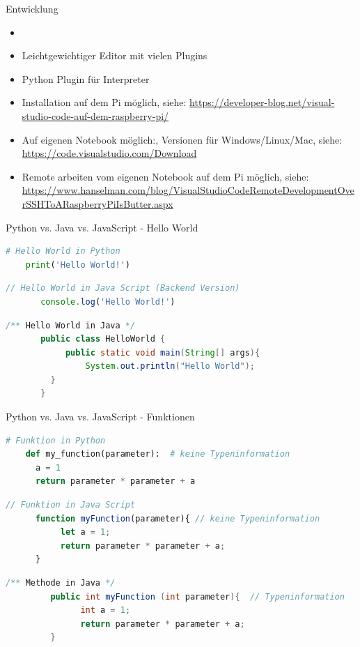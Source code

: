 \begin{frame}{Entwicklung}

    \begin{itemize}
    \setlength{\itemindent}{2.1in}
     \item [\textbf{ Entwicklung mit Visual Studio Code }]
    \end{itemize}
    \begin{itemize}
        \item Leichtgewichtiger Editor mit vielen Plugins
        \item Python Plugin für Interpreter
        \item Installation auf dem Pi möglich,  siehe: \url{https://developer-blog.net/visual-studio-code-auf-dem-raspberry-pi/}
        \item Auf eigenen Notebook möglich:, Versionen für Windows/Linux/Mac, siehe: \url{https://code.visualstudio.com/Download}
        \item Remote arbeiten vom eigenen Notebook auf dem Pi möglich, siehe: \url{https://www.hanselman.com/blog/VisualStudioCodeRemoteDevelopmentOverSSHToARaspberryPiIsButter.aspx}

     \end{itemize}
\end{frame}




\begin{frame}[fragile]{Python vs. Java vs. JavaScript - Hello World}
\begin{lstlisting}[language=Python]
	# Hello World in Python
 	print('Hello World!')
\end{lstlisting}
\begin{lstlisting}[language=JavaScript]
       // Hello World in Java Script (Backend Version)
       console.log('Hello World!')
\end{lstlisting}
\begin{lstlisting}[language=Java]
       /** Hello World in Java */
       public class HelloWorld {
      	    public static void main(String[] args){
                System.out.println("Hello World");
      	 }
       }
\end{lstlisting}
\end{frame}

\begin{frame}[fragile]{Python vs. Java vs. JavaScript - Funktionen}
\begin{lstlisting}[language=Python]
	# Funktion in Python
 	def my_function(parameter):  # keine Typeninformation
	  a = 1
	  return parameter * parameter + a
	\end{lstlisting}
\begin{lstlisting}[language=JavaScript]
       // Funktion in Java Script
 	  function myFunction(parameter){ // keine Typeninformation
	       let a = 1;
	       return parameter * parameter + a;
	  }
\end{lstlisting}
\begin{lstlisting}[language=Java]
       /** Methode in Java */
      	 public int myFunction (int parameter){  // Typeninformation
	           int a = 1;
	           return parameter * parameter + a;
         }
\end{lstlisting}
\end{frame}

